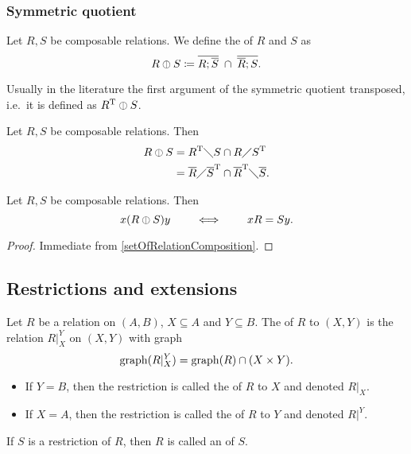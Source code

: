 \subsubsection{Symmetric quotient}
\begin{definition}
Let $R,S$ be composable relations. We define the  of $R$ and $S$ as
\[ R \mathbin{\obar} S \coloneqq \overline{R;\overline{S}} \;\cap\; \overline{\overline{R};S}. \]
\end{definition}
Usually in the literature the first argument of the symmetric quotient transposed, i.e.\ it is defined as $R^{\mathrm{T}} \mathbin{\obar} S$.

\begin{lemma}
Let $R,S$ be composable relations. Then
\begin{align*}
R\mathbin{\obar} S &= R^{\mathrm{T}}\diagdown S \cap R\diagup S^{\mathrm{T}} \\
&= \overline{R}\diagup \overline{S}^{\mathrm{T}} \cap \overline{R}^{\mathrm{T}} \diagdown \overline{S}.
\end{align*}
\end{lemma}

\begin{lemma}
Let $R,S$ be composable relations. Then
\[ x(R\mathbin{\obar} S)y \qquad\iff\qquad xR = Sy. \]
\end{lemma}
\begin{proof}
Immediate from \ref{setOfRelationComposition}.
\end{proof}

\subsection{Restrictions and extensions}
\begin{definition}
Let $R$ be a relation on $(A, B)$, $X\subseteq A$ and $Y \subseteq B$. The  of $R$ to $(X,Y)$ is the relation $R|^Y_X$ on $(X,Y)$ with graph
\[ \operatorname{graph}(R|^Y_X) = \operatorname{graph}(R)\cap (X\times Y). \]
\begin{itemize}
\item If $Y = B$, then the restriction is called the  of $R$ to $X$ and denoted $\left.R\right|_X$.
\item If $X = A$, then the restriction is called the  of $R$ to $Y$ and denoted $\left.R\right|^Y$.
\end{itemize}
If $S$ is a restriction of $R$, then $R$ is called an  of $S$.
\end{definition}

